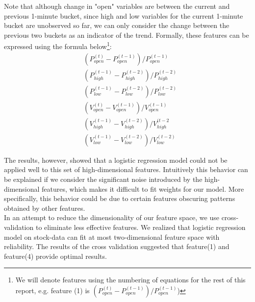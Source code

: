 \documentclass[10pt,twocolumn,letterpaper]{article}
\begin{document}
Note that although change in "open" variables are between the current and previous 1-minute bucket, since high and low variables for the current 1-minute bucket are unobserved so far, we can only consider the change between the previous two buckets as an indicator of the trend. Formally, these features can be expressed using the formula below\footnote{We will denote features using the numbering of equations for the rest of this report, e.g. feature (1) is $\left(P_{open}^{(t)} - P_{open}^{(t-1)}\right)/P_{open}^{(t-1)}$)}: 
 \begin{eqnarray}
&\left(P_{open}^{(t)} - P_{open}^{(t-1)}\right)/P_{open}^{(t-1)} \\
&\left(P_{high}^{(t-1)} - P_{high}^{(t-2)}\right)/P_{high}^{(t-2)} \\
&\left(P_{low}^{(t-1)} - P_{low}^{(t-2)}\right)/P_{low}^{(t-2)} \\
&\left(V_{open}^{(t)} - V_{open}^{(t-1)}\right)/V_{open}^{(t-1)} \\
&\left(V_{high}^{(t-1)} - V_{high}^{(t-2)}\right)/V_{high}^{(t-2} \\
&\left(V_{low}^{(t-1)} - V_{low}^{(t-2)}\right)/V_{low}^{(t-2)}
\end{eqnarray}

The results, however, showed that a logistic regression model could not be applied well to this set of high-dimensional features. Intuitively this behavior can be explained if we consider the significant noise introduced by the high-dimensional features, which makes it difficult to fit weights for our model. More specifically, this behavior could be due to certain features obscuring patterns obtained by other features.\\

In an attempt to reduce the dimensionality of our feature space, we use cross-validation to eliminate less effective features. We realized that logistic regression model on stock-data can fit at most two-dimensional feature space with reliability. The results of the cross validation suggested that feature(1) and feature(4) provide optimal results.\\
\end{document}
